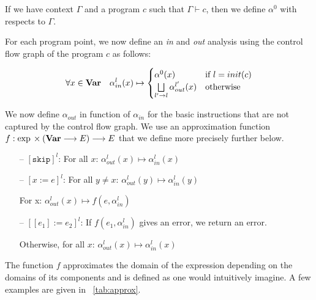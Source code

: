 If we have context $\Gamma$ and a program $c$ such that $\Gamma \vdash c$, then we define $\alpha^0$ with respects to $\Gamma$.

For each program point, we now define an \emph{in} and \emph{out} analysis using the control flow graph of the program $c$ as follows:

\[
\forall x \in \mathbf{Var}{} \quad \alpha_{in}^l(x) \mapsto
	\begin{cases}
		\alpha^0(x) & \text{if $l = init(c)$} \\
		\bigsqcup\limits_{l' \rightarrow l} \alpha_{out}^{l'}(x) & \text{otherwise} \\
	\end{cases}
\]

We now define $\alpha_{out}$ in function of $\alpha_{in}$ for the basic instructions that are not captured by the control flow graph.
We use an approximation function $f: \exp{} \times (\mathbf{Var}{} \longrightarrow E) \longrightarrow E$ that we define more precisely further below.

\begin{itemize}
	\itemsep0em
	\item[--] $\left[\texttt{skip}\right]^l$: For all $x$: $\alpha_{out}^l(x) \mapsto \alpha_{in}^l(x)$
	\item[--] $\left[x := e\right]^l$: For all $y \neq x$: $\alpha_{out}^l(y) \mapsto \alpha_{in}^l(y)$
	
	For x: $\alpha_{out}^l(x) \mapsto f(e, \alpha_{in}^l)$
	\item[--] $\left[[e_1] := e_2\right]^l$: If $f(e_1, \alpha_{in}^l)$ gives an error, we return an error.
	
	Otherwise, for all $x$: $\alpha_{out}^l(x) \mapsto \alpha_{in}^l(x)$
\end{itemize}

The function $f$ approximates the domain of the expression depending on the domains of its components and is defined as one would intuitively imagine.
A few examples are given in \tablename~\ref{tab:approx}.

